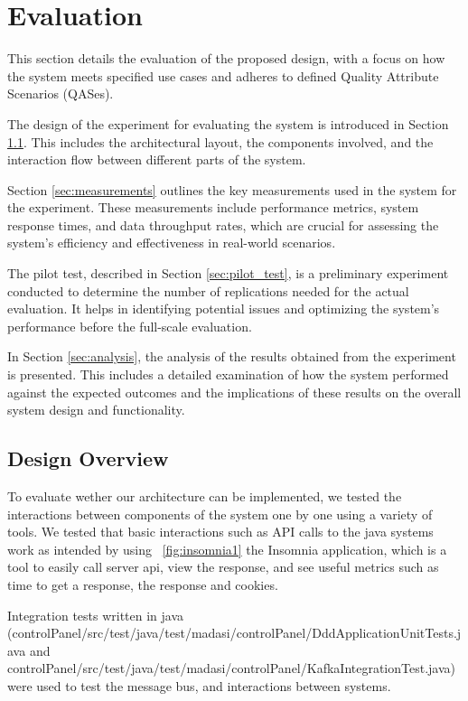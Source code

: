 \section{Evaluation}
\label{sec:evaluation}
This section details the evaluation of the proposed design, with a focus on how the system meets specified use cases and adheres to defined Quality Attribute Scenarios (QASes).

The design of the experiment for evaluating the system is introduced in Section \ref{sec:design}. This includes the architectural layout, the components involved, and the interaction flow between different parts of the system.

Section \ref{sec:measurements} outlines the key measurements used in the system for the experiment. These measurements include performance metrics, system response times, and data throughput rates, which are crucial for assessing the system's efficiency and effectiveness in real-world scenarios.

The pilot test, described in Section \ref{sec:pilot_test}, is a preliminary experiment conducted to determine the number of replications needed for the actual evaluation. It helps in identifying potential issues and optimizing the system's performance before the full-scale evaluation.

In Section \ref{sec:analysis}, the analysis of the results obtained from the experiment is presented. This includes a detailed examination of how the system performed against the expected outcomes and the implications of these results on the overall system design and functionality.

\subsection{Design Overview}
\label{sec:design}

To evaluate wether our architecture can be implemented, we tested the interactions between components of the system one by one using a variety of tools. We tested that basic interactions such as API calls to the java systems work as intended by using ~\ref{fig:insomnia1} the Insomnia application, which is a tool to easily call server api, view the response, and see useful metrics such as time to get a response, the response and cookies.\newline

Integration tests written in java (controlPanel/src/test/java/test/madasi/controlPanel/DddApplicationUnitTests.java and controlPanel/src/test/java/test/madasi/controlPanel/KafkaIntegrationTest.java) were used to test the message bus, and interactions between systems. \newline

